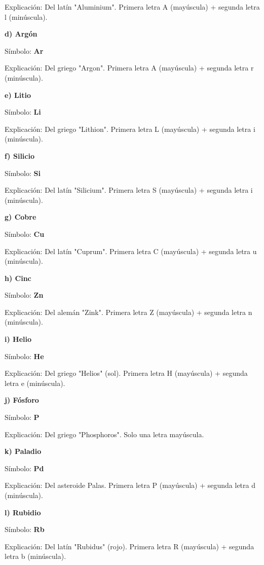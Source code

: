 \begin{exercise}
\begin{solu}
        Explicación: Del latín "Aluminium". Primera letra A (mayúscula) + segunda letra l (minúscula).

        \textbf{d) Argón}

        Símbolo: \textbf{Ar}

        Explicación: Del griego "Argon". Primera letra A (mayúscula) + segunda letra r (minúscula).

        \textbf{e) Litio}

        Símbolo: \textbf{Li}

        Explicación: Del griego "Lithion". Primera letra L (mayúscula) + segunda letra i (minúscula).

        \textbf{f) Silicio}

        Símbolo: \textbf{Si}

        Explicación: Del latín "Silicium". Primera letra S (mayúscula) + segunda letra i (minúscula).

        \textbf{g) Cobre}

        Símbolo: \textbf{Cu}

        Explicación: Del latín "Cuprum". Primera letra C (mayúscula) + segunda letra u (minúscula).

        \textbf{h) Cinc}

        Símbolo: \textbf{Zn}

        Explicación: Del alemán "Zink". Primera letra Z (mayúscula) + segunda letra n (minúscula).

        \textbf{i) Helio}

        Símbolo: \textbf{He}

        Explicación: Del griego "Helios" (sol). Primera letra H (mayúscula) + segunda letra e (minúscula).

        \textbf{j) Fósforo}

        Símbolo: \textbf{P}

        Explicación: Del griego "Phosphoros". Solo una letra mayúscula.

        \textbf{k) Paladio}

        Símbolo: \textbf{Pd}

        Explicación: Del asteroide Palas. Primera letra P (mayúscula) + segunda letra d (minúscula).

        \textbf{l) Rubidio}

        Símbolo: \textbf{Rb}

        Explicación: Del latín "Rubidus" (rojo). Primera letra R (mayúscula) + segunda letra b (minúscula).


\end{solu}
\end{exercise}
